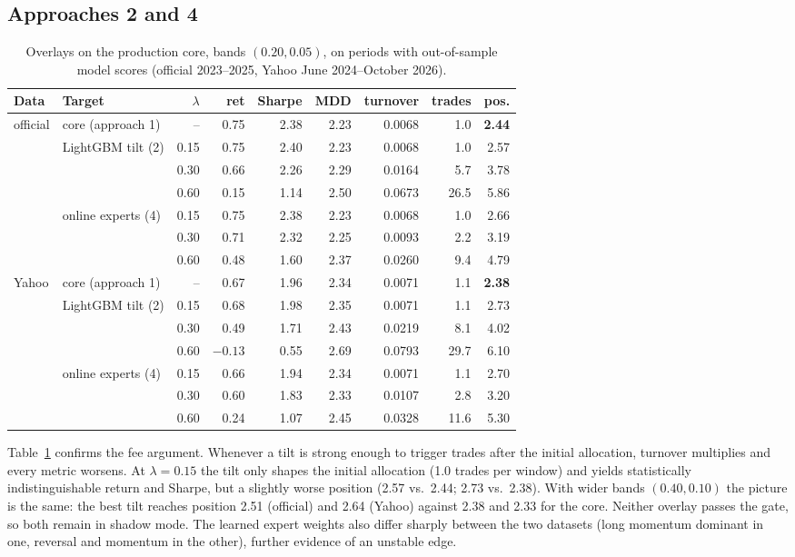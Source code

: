 \documentclass[11pt,a4paper]{article}
\begin{document}
\subsection{Approaches 2 and 4}
\begin{table}[h]
\centering\footnotesize
\begin{tabular}{llrrrrrrr}
\toprule
Data & Target & $\lambda$ & ret & Sharpe & MDD & turnover & trades & pos. \\
\midrule
official & core (approach 1) & -- & 0.75 & 2.38 & 2.23 & 0.0068 & 1.0 & \textbf{2.44} \\
 & LightGBM tilt (2) & 0.15 & 0.75 & 2.40 & 2.23 & 0.0068 & 1.0 & 2.57 \\
 & & 0.30 & 0.66 & 2.26 & 2.29 & 0.0164 & 5.7 & 3.78 \\
 & & 0.60 & 0.15 & 1.14 & 2.50 & 0.0673 & 26.5 & 5.86 \\
 & online experts (4) & 0.15 & 0.75 & 2.38 & 2.23 & 0.0068 & 1.0 & 2.66 \\
 & & 0.30 & 0.71 & 2.32 & 2.25 & 0.0093 & 2.2 & 3.19 \\
 & & 0.60 & 0.48 & 1.60 & 2.37 & 0.0260 & 9.4 & 4.79 \\
\midrule
Yahoo & core (approach 1) & -- & 0.67 & 1.96 & 2.34 & 0.0071 & 1.1 & \textbf{2.38} \\
 & LightGBM tilt (2) & 0.15 & 0.68 & 1.98 & 2.35 & 0.0071 & 1.1 & 2.73 \\
 & & 0.30 & 0.49 & 1.71 & 2.43 & 0.0219 & 8.1 & 4.02 \\
 & & 0.60 & $-0.13$ & 0.55 & 2.69 & 0.0793 & 29.7 & 6.10 \\
 & online experts (4) & 0.15 & 0.66 & 1.94 & 2.34 & 0.0071 & 1.1 & 2.70 \\
 & & 0.30 & 0.60 & 1.83 & 2.33 & 0.0107 & 2.8 & 3.20 \\
 & & 0.60 & 0.24 & 1.07 & 2.45 & 0.0328 & 11.6 & 5.30 \\
\bottomrule
\end{tabular}
\caption{Overlays on the production core, bands $(0.20,0.05)$, on periods with out-of-sample model scores
(official 2023--2025, Yahoo June 2024--October 2026).}
\label{tab:overlays}
\end{table}

Table~\ref{tab:overlays} confirms the fee argument. Whenever a tilt is strong enough to trigger trades after the initial
allocation, turnover multiplies and every metric worsens. At $\lambda=0.15$ the tilt only shapes the initial allocation
(1.0 trades per window) and yields statistically indistinguishable return and Sharpe, but a slightly worse position (2.57
vs.\ 2.44; 2.73 vs.\ 2.38). With wider bands $(0.40,0.10)$ the picture is the same: the best tilt reaches position 2.51
(official) and 2.64 (Yahoo) against 2.38 and 2.33 for the core. Neither overlay passes the gate, so both remain in shadow
mode. The learned expert weights also differ sharply between the two datasets (long momentum dominant in one, reversal
and momentum in the other), further evidence of an unstable edge.
\end{document}
